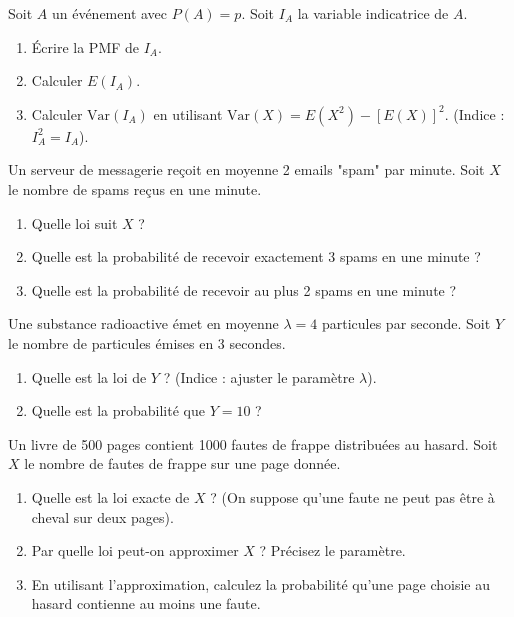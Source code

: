 \begin{exercicebox}
Soit $A$ un événement avec $P(A) = p$. Soit $I_A$ la variable indicatrice de $A$.
\begin{enumerate}
    \item Écrire la PMF de $I_A$.
    \item Calculer $E(I_A)$.
    \item Calculer $\text{Var}(I_A)$ en utilisant $\text{Var}(X) = E(X^2) - [E(X)]^2$. (Indice : $I_A^2 = I_A$).
\end{enumerate}
\end{exercicebox}


\begin{exercicebox}
Un serveur de messagerie reçoit en moyenne 2 emails "spam" par minute. Soit $X$ le nombre de spams reçus en une minute.
\begin{enumerate}
    \item Quelle loi suit $X$ ?
    \item Quelle est la probabilité de recevoir exactement 3 spams en une minute ?
    \item Quelle est la probabilité de recevoir au plus 2 spams en une minute ?
\end{enumerate}
\end{exercicebox}

\begin{exercicebox}
Une substance radioactive émet en moyenne $\lambda=4$ particules par seconde. Soit $Y$ le nombre de particules émises en 3 secondes.
\begin{enumerate}
    \item Quelle est la loi de $Y$ ? (Indice : ajuster le paramètre $\lambda$).
    \item Quelle est la probabilité que $Y=10$ ?
\end{enumerate}
\end{exercicebox}

\begin{exercicebox}
Un livre de 500 pages contient 1000 fautes de frappe distribuées au hasard. Soit $X$ le nombre de fautes de frappe sur une page donnée.
\begin{enumerate}
    \item Quelle est la loi exacte de $X$ ? (On suppose qu'une faute ne peut pas être à cheval sur deux pages).
    \item Par quelle loi peut-on approximer $X$ ? Précisez le paramètre.
    \item En utilisant l'approximation, calculez la probabilité qu'une page choisie au hasard contienne au moins une faute.
\end{enumerate}
\end{exercicebox}

